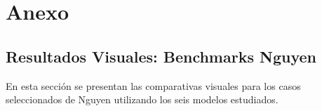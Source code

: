 \appendix
\section*{Anexo}

\subsection*{Resultados Visuales: Benchmarks Nguyen}

En esta sección se presentan las comparativas visuales para los casos seleccionados de Nguyen utilizando los seis modelos estudiados.









